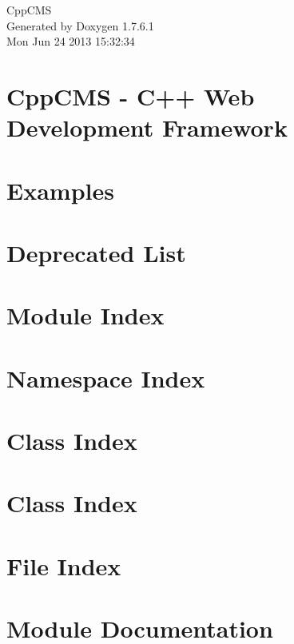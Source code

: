 \documentclass[a4paper]{book}
\begin{document}
\begin{titlepage}
\vspace*{7cm}
\begin{center}
{\Large \-Cpp\-C\-M\-S }\\
\vspace*{1cm}
{\large \-Generated by Doxygen 1.7.6.1}\\
\vspace*{0.5cm}
{\small Mon Jun 24 2013 15:32:34}\\
\end{center}
\end{titlepage}
\clearemptydoublepage
{}
\tableofcontents
\clearemptydoublepage
{}
\chapter{\-Cpp\-C\-M\-S -\/ \-C++ \-Web \-Development \-Framework}
\label{index}
\chapter{\-Examples}
\label{examples_page}

\chapter{\-Deprecated \-List}
\label{deprecated}

\chapter{\-Module \-Index}

\chapter{\-Namespace \-Index}

\chapter{\-Class \-Index}

\chapter{\-Class \-Index}

\chapter{\-File \-Index}

\chapter{\-Module \-Documentation}







\end{document}
